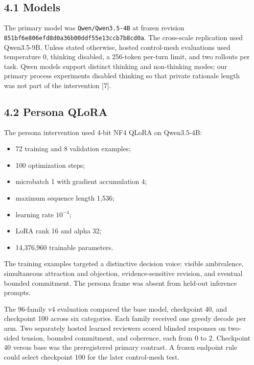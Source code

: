 \documentclass[
  11pt,
  letterpaper,
]{article}
\providecommand{\tightlist}{%
  \setlength{\itemsep}{0pt}\setlength{\parskip}{0pt}}
\begin{document}
\subsection{4.1 Models}\label{models}

The primary model was \texttt{Qwen/Qwen3.5-4B} at frozen revision
\nolinkurl{851bf6e806efd8d0a36b00ddf55e13ccb7b8cd0a}. The cross-scale
replication used Qwen3.5-9B. Unless stated otherwise, hosted
control-mesh evaluations used temperature 0, thinking disabled, a
256-token per-turn limit, and two rollouts per task. Qwen models support
distinct thinking and non-thinking modes; our primary process
experiments disabled thinking so that private rationale length was not
part of the intervention {[}7{]}.

\subsection{4.2 Persona QLoRA}\label{persona-qlora}

The persona intervention used 4-bit NF4 QLoRA on Qwen3.5-4B:

\begin{itemize}
\tightlist
\item
  72 training and 8 validation examples;
\item
  100 optimization steps;
\item
  microbatch 1 with gradient accumulation 4;
\item
  maximum sequence length 1,536;
\item
  learning rate \(10^{-4}\);
\item
  LoRA rank 16 and alpha 32;
\item
  14,376,960 trainable parameters.
\end{itemize}

The training examples targeted a distinctive decision voice: visible
ambivalence, simultaneous attraction and objection, evidence-sensitive
revision, and eventual bounded commitment. The persona frame was absent
from held-out inference prompts.

The 96-family v4 evaluation compared the base model, checkpoint 40, and
checkpoint 100 across six categories. Each family received one greedy
decode per arm. Two separately hosted learned reviewers scored blinded
responses on two-sided tension, bounded commitment, and coherence, each
from 0 to 2. Checkpoint 40 versus base was the preregistered primary
contrast. A frozen endpoint rule could select checkpoint 100 for the
later control-mesh test.
\end{document}
